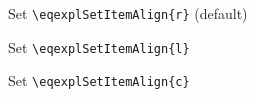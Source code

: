 \documentclass{article}
\begin{document}
\noindent Set \verb+\eqexplSetItemAlign{r}+ (default)

\begin{eqexpl}
  \testList
\end{eqexpl}

\vspace{5mm}

\noindent Set \verb+\eqexplSetItemAlign{l}+

\begin{eqexpl}
  \testList
\end{eqexpl}

\vspace{5mm}

\noindent Set \verb+\eqexplSetItemAlign{c}+

\begin{eqexpl}
  \testList
\end{eqexpl}

\end{document}
